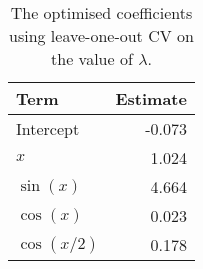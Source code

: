 \begin{table}[t]

\caption{\label{tab:lasso-coefs}The optimised coefficients using leave-one-out \ac{CV} on the value of \(\lambda\).}
\centering
\begin{tabular}{lr}
\toprule
Term & Estimate\\
\midrule
Intercept & -0.073\\
\(x\) & 1.024\\
\(\sin(x)\) & 4.664\\
\(\cos(x)\) & 0.023\\
\(\cos(x/2)\) & 0.178\\
\bottomrule
\end{tabular}
\end{table}
